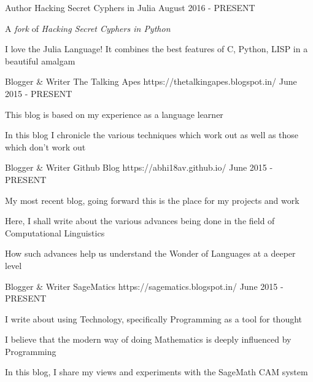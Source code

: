 \begin{cventries}
  \cventry
    {Author}
    {Hacking Secret Cyphers in Julia}
    {}
    {August 2016 - PRESENT}
    {
      \begin{cvitems}
        \item {A \textit{fork} of\textit{ Hacking Secret Cyphers in Python}}
        \item {I love the Julia Language! It combines the best features of C, Python, LISP in a beautiful amalgam}
      \end{cvitems}
    }

  \cventry
    {Blogger \& Writer}
    {The Talking Apes}
    {https://thetalkingapes.blogspot.in/}
    {June 2015 - PRESENT}
    {
      \begin{cvitems}
        \item {This blog is based on my experience as a language learner}
        \item {In this blog I chronicle the various techniques which work out as well as those which don't work out}
      \end{cvitems}
    }
    
  \cventry
    {Blogger \& Writer}
    {Github Blog}
    {https://abhi18av.github.io/}
    {June 2015 - PRESENT}
    {
      \begin{cvitems}
        \item {My most recent blog, going forward this is the place for my projects and work}
        \item {Here, I shall write about the various advances being done in the field of Computational Linguistics}
		\item {How such advances help us understand the Wonder of Languages at a deeper level}        
      \end{cvitems}
    }    
    
  \cventry
    {Blogger \& Writer}
    {SageMatics}
    {https://sagematics.blogspot.in/}
    {June 2015 - PRESENT}
    {
      \begin{cvitems}
        \item {I write about using Technology, specifically Programming as a tool for thought}
        \item {I believe that the modern way of doing Mathematics is deeply influenced by Programming}
        \item {In this blog, I share my views and experiments with the SageMath CAM system}
      \end{cvitems}
    }
    
    

\end{cventries}
